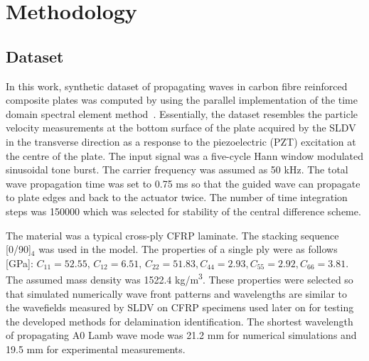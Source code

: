 \section{Methodology}
\subsection{Dataset}
In this work, synthetic dataset of propagating waves in carbon fibre reinforced composite plates was computed by using the parallel implementation of the time domain spectral element method~\cite{Kudela2020}. 
Essentially, the dataset resembles the particle velocity measurements at the bottom surface of the plate acquired by the SLDV in the transverse direction as a response to the piezoelectric (PZT) excitation at the centre of the plate. 
The input signal was a five-cycle Hann window modulated sinusoidal tone burst. The carrier frequency was assumed as 50 kHz. 
The total wave propagation time was set to 0.75 ms so that the guided wave can propagate to plate edges and back to the actuator twice.
The number of time integration steps was 150000 which was selected for stability of the central difference scheme.

The material was a typical cross-ply CFRP laminate. 
The stacking sequence [0/90]\(_4\) was used in the model. 
The properties of a single ply were as follows [GPa]:
\(C_{11} = 52.55, \, C_{12} = 6.51, \, C_{22} = 51.83, C_{44} = 2.93, C_{55} = 2.92, C_{66} = 3.81\). 
The assumed mass density was 1522.4 kg/m\textsuperscript{3}.
These properties were selected so that simulated numerically wave front patterns and wavelengths
are similar to the wavefields measured by SLDV on CFRP specimens used later on for testing the developed methods for delamination identification.
The shortest wavelength of propagating A0 Lamb wave mode was 21.2 mm for numerical simulations and 19.5 mm for experimental measurements. 

